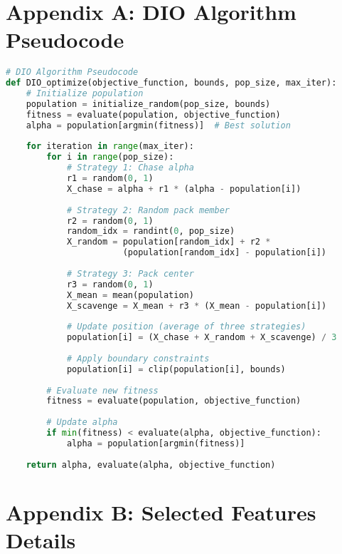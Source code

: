 \documentclass[12pt, a4paper]{article}
\begin{document}
\newpage
\appendix
\section{Appendix A: DIO Algorithm Pseudocode}

\begin{lstlisting}[language=Python, caption={DIO Algorithm Implementation}]
# DIO Algorithm Pseudocode
def DIO_optimize(objective_function, bounds, pop_size, max_iter):
    # Initialize population
    population = initialize_random(pop_size, bounds)
    fitness = evaluate(population, objective_function)
    alpha = population[argmin(fitness)]  # Best solution
    
    for iteration in range(max_iter):
        for i in range(pop_size):
            # Strategy 1: Chase alpha
            r1 = random(0, 1)
            X_chase = alpha + r1 * (alpha - population[i])
            
            # Strategy 2: Random pack member
            r2 = random(0, 1)
            random_idx = randint(0, pop_size)
            X_random = population[random_idx] + r2 * 
                       (population[random_idx] - population[i])
            
            # Strategy 3: Pack center
            r3 = random(0, 1)
            X_mean = mean(population)
            X_scavenge = X_mean + r3 * (X_mean - population[i])
            
            # Update position (average of three strategies)
            population[i] = (X_chase + X_random + X_scavenge) / 3
            
            # Apply boundary constraints
            population[i] = clip(population[i], bounds)
        
        # Evaluate new fitness
        fitness = evaluate(population, objective_function)
        
        # Update alpha
        if min(fitness) < evaluate(alpha, objective_function):
            alpha = population[argmin(fitness)]
    
    return alpha, evaluate(alpha, objective_function)
\end{lstlisting}

\section{Appendix B: Selected Features Details}
\end{document}
